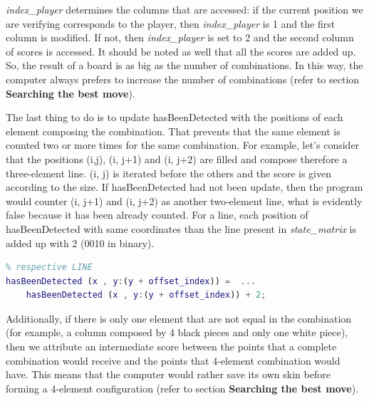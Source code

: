\textit{index\_player} determines the columns that are accessed: if the current
position we are verifying corresponds to the player, then \textit{index\_player}
is 1 and the first column is modified. If not, then \textit{index\_player} is set to 2
and the second column of scores is accessed. It should be noted as well that
all the scores are added up. So, the result of a board is as big as the number
of combinations. In this way, the computer always prefers to increase the number
of combinations (refer to section \textbf{Searching the best move}).

\vspace{10pt}

The last thing to do is to update hasBeenDetected with the positions of each
element composing the combination. That prevents that the same element is
counted two or more times for the same combination. For example, let’s consider
that the positions (i,j), (i, j+1) and (i, j+2) are filled and
compose therefore a three-element line. (i, j) is iterated before the others
and the score is given according to the size. If hasBeenDetected had not been update,
then the program would counter (i, j+1) and (i, j+2) as another
two-element line, what is evidently false because it has been already counted. For a line,
each position of hasBeenDetected with same coordinates than the line present in
\textit{state\_matrix} is added up with 2 (0010 in binary).

\vspace{10pt}

\begin{lstlisting}[language=Matlab]
% fills hasBeenDetected with 0010 in the
% respective LINE
hasBeenDetected (x , y:(y + offset_index)) =  ... 
	hasBeenDetected (x , y:(y + offset_index)) + 2;
\end{lstlisting}

\vspace{10pt}

Additionally, if there is only one element that are not equal in the combination
(for example, a column composed by 4 black pieces and only one white piece),
then we attribute an intermediate score between the points that a complete
combination would receive and the points that 4-element combination would have.
This means that the computer would rather save its own skin before forming a
4-element configuration (refer to section \textbf{Searching the best move}).

\vspace{10pt}

